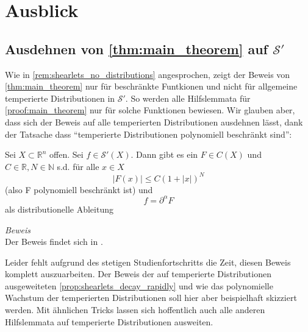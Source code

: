 
\section{Ausblick} %
\label{sec:ausblick}

\subsection{\texorpdfstring{Ausdehnen von \cref{thm:main_theorem} auf $\mathcal{S}'$}{Ausdehnen auf Distributionen}} %
\label{sec:ausdehnen_von_thm:main_theorem}
Wie in \cref{rem:shearlets_no_distributions} angesprochen, zeigt der Beweis von \textcite{Kutyniok2008} \cref{thm:main_theorem} nur für beschränkte Funtkionen und nicht für allgemeine temperierte Distributionen in $\mathcal{S}'$. So werden alle Hilfslemmata für \cref{proof:main_theorem} nur für solche Funktionen bewiesen. Wir glauben aber, dass sich der Beweis auf alle temperierten Distributionen ausdehnen lässt, dank der Tatsache dass "`temperierte Distributionen polynomiell beschränkt sind"':

\begin{theorem}
\label{thm:struktursatz}
    Sei $X \subset \mathbb{R}^n$ offen. Sei $f \in \mathcal{S}'(X)$. Dann gibt es ein $F \in C(X)$ und $C \in \mathbb{R}, N \in \mathbb{N}$ s.d. für alle $x \in X$
    \begin{equation*}
        |F(x)| \leq C (1+|x| )^N
    \end{equation*}
    (also F polynomiell beschränkt ist) und
    \begin{equation*}
        f = \partial^\alpha F
    \end{equation*}
    als distributionelle Ableitung

    \emph{Beweis} \\[.5em]
    Der Beweis findet sich in \textcite[S. 97]{Friedlander1998}.
\end{theorem}


Leider fehlt aufgrund des stetigen Studienfortschritts die Zeit, diesen Beweis komplett auszuarbeiten. Der Beweis der auf temperierte Distributionen ausgeweiteten \cref{prop:shearlets_decay_rapidly} und wie das polynomielle Wachstum der temperierten Distributionen soll hier aber beispielhaft skizziert werden.  Mit ähnlichen Tricks lassen sich hoffentlich auch alle anderen Hilfslemmata auf temperierte Distributionen ausweiten.

